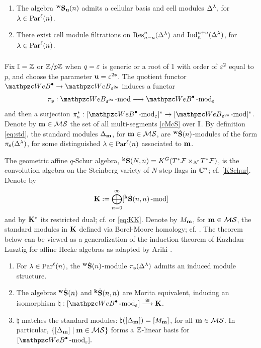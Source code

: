 \begin{alphatheorem}  
\label{thm:A}
\begin{enumerate}
    \item The algebra ${}^{\bold{w}}\bold{S}_{\mathbf{u}}(n)$ admits a cellular basis and cell modules $\Delta^\lambda$, for $\lambda \in \text{Par}^\ell(n)$.
    \item 
    There exist cell module filtrations on $\operatorname{Res}\nolimits^n_{n-a}(\Delta^\lambda)$ and $\operatorname{Ind}\nolimits_n^{n+a} (\Delta^\lambda)$, for $\lambda \in \text{Par}^\ell(n)$. 
\end{enumerate}
\end{alphatheorem}

\subsubsection{}
Fix $\mathbb{I} =\mathbb{Z}$ or $\mathbb{Z}/p\mathbb{Z}$ when $q=\varepsilon$ is generic or a root of 1 with order of $\varepsilon^2$ equal to $p$, and choose the parameter $\mathbf{u} =\varepsilon^{2\mathbf{s}}$. The quotient functor $\qAW \to\qW_{\eps^{2\bfs}}$ induces a functor 
\[
\pi_\bfs: \qW_{\eps^{2\bfs}}\modf \longrightarrow \qAW\modf_\eps
\]
and then a surjection $\pi_\bfs^*: [\qAW\modf_\eps]^* \rightarrow [\qW_{\eps^{2\bfs}}\modf]^*$. Denote by $\mathbf{m}\in\mathcal{M}\mathcal{S}$ the set of all multi-segments \eqref{cMcS} over $\mathbb{I}$. By definition \eqref{eq:std}, the standard modules $\Delta_{\mathbf{m}}$, for $\mathbf{m}\in\mathcal{M}\mathcal{S}$, are ${}^{\bold{w}}\dot{\bold{S}}(n)$-modules of the form $\pi_{\mathbf{s}}(\Delta^\lambda)$, for some distinguished $\lambda \in \text{Par}^\ell(n)$ associated to $\mathbf{m}$. 

The geometric affine $q$-Schur algebra, ${}^{\bold{k}}\dot{\bold{S}}(N,n) =K^G(T^*\mathcal{F} \times_{\mathcal{N}} T^*\mathcal{F})$, is the convolution algebra on the Steinberg variety of $N$-step flags in $\mathbb{C}^n$; cf. \eqref{KSchur}. Denote by 
\[
{\bf{K}} :=\bigoplus_{n=0}^\infty [{}^{\bold{k}}\dot{\bold{S}}(n,n)\operatorname{-mod}\nolimits]
\]
and by $\bf{K}^*$ its restricted dual; cf. \cite{GV93, V98} or \eqref{eq:KK}. Denote by $M_{\mathbf{m}}$, for $\mathbf{m}\in\mathcal{M}\mathcal{S}$,  the standard modules in $\bf{K}$ defined via Borel-Moore homology; cf. \cite{CG97, VV99}. The theorem below can be viewed as a generalization of the induction theorem of Kazhdan-Lusztig \cite{KL87} for affine Hecke algebras as adapted by Ariki \cite{Ar96}.

\begin{alphatheorem} [Theorem \ref{thm:induced}, Proposition \ref{prop:Morita} and Theorem \ref{thm:ind=std}]
\label{thm:B}
\qquad
    \begin{enumerate}
        \item 
        For $\lambda \in \text{Par}^\ell(n)$, the ${}^{\bold{w}}\dot{\bold{S}}(n)$-module $\pi_{\mathbf{s}} (\Delta^\lambda)$ admits an induced module structure. 
        \item The algebras ${}^{\bold{w}}\dot{\bold{S}}(n)$ and ${}^{\bold{k}}\dot{\bold{S}}(n,n)$ are Morita equivalent, inducing an isomorphism $\natural: [\qAW\modf_\eps] \stackrel{\cong}{\longrightarrow}\K$.
        \item $\natural$ matches the standard modules:  $\natural([\Delta_{\mathbf{m}}] )= [M_{\mathbf{m}}]$, for all $\mathbf{m}\in\mathcal{M}\mathcal{S}$. In particular, $\{[{\Delta}_{\mathbf{m}}]\mid \mathbf{m}\in\mathcal{M}\mathcal{S}\}$ forms a $\mathbb{Z}$-linear basis for $[\qAW\modf_\eps].$
    \end{enumerate}
\end{alphatheorem}

